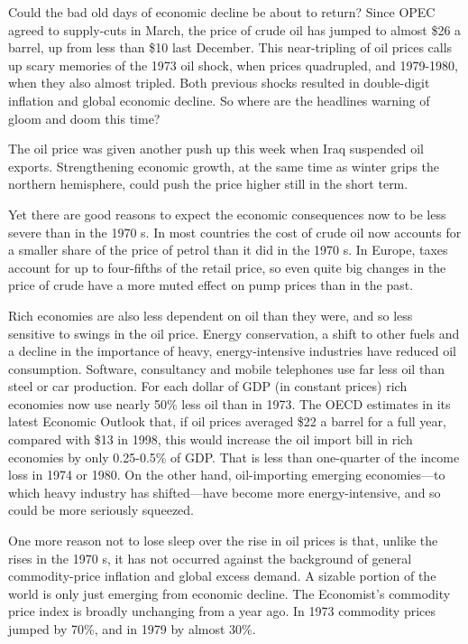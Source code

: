 Could the bad old days of economic decline be about to return? Since
OPEC agreed to supply-cuts in March, the price of crude oil has jumped
to almost \$26 a barrel, up from less than \$10 last December. This
near-tripling of oil prices calls up scary memories of the 1973 oil
shock, when prices quadrupled, and 1979-1980, when they also almost
tripled. Both previous shocks resulted in double-digit inflation and
global economic decline. So where are the headlines warning of gloom and
doom this time?

The oil price was given another push up this week when Iraq suspended
oil exports. Strengthening economic growth, at the same time as winter
grips the northern hemisphere, could push the price higher still in the
short term.

Yet there are good reasons to expect the economic consequences now to be
less severe than in the 1970 s. In most countries the cost of crude oil
now accounts for a smaller share of the price of petrol than it did in
the 1970 s. In Europe, taxes account for up to four-fifths of the retail
price, so even quite big changes in the price of crude have a more muted
effect on pump prices than in the past.

Rich economies are also less dependent on oil than they were, and so
less sensitive to swings in the oil price. Energy conservation, a shift
to other fuels and a decline in the importance of heavy,
energy-intensive industries have reduced oil consumption. Software,
consultancy and mobile telephones use far less oil than steel or car
production. For each dollar of GDP (in constant prices) rich economies
now use nearly 50\% less oil than in 1973. The OECD estimates in its
latest Economic Outlook that, if oil prices averaged \$22 a barrel for a
full year, compared with \$13 in 1998, this would increase the oil
import bill in rich economies by only 0.25-0.5\% of GDP. That is less
than one-quarter of the income loss in 1974 or 1980. On the other hand,
oil-importing emerging economies---to which heavy industry has
shifted---have become more energy-intensive, and so could be more
seriously squeezed.

One more reason not to lose sleep over the rise in oil prices is that,
unlike the rises in the 1970 s, it has not occurred against the
background of general commodity-price inflation and global excess
demand. A sizable portion of the world is only just emerging from
economic decline. The Economist's commodity price index is broadly
unchanging from a year ago. In 1973 commodity prices jumped by 70\%, and
in 1979 by almost 30\%.


